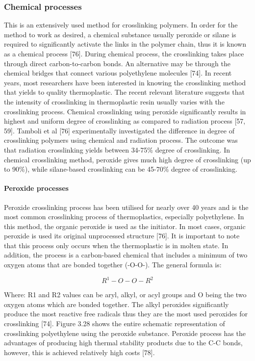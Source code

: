 \documentclass[12pt]{report}
\begin{document}

\subsubsection{Chemical processes}
This is an extensively used method for crosslinking polymers. In order for the method to work as desired, a chemical substance usually peroxide or silane is required to significantly activate the links in the polymer chain, thus it is known as a chemical process [76]. During chemical process, the crosslinking takes place through direct carbon-to-carbon bonds. An alternative may be through the chemical bridges that connect various polyethylene molecules [74].  
In recent years, most researchers have been interested in knowing the crosslinking method that yields to quality thermoplastic. The recent relevant literature suggests that the intensity of crosslinking in thermoplastic resin usually varies with the crosslinking process. Chemical crosslinking using peroxide significantly results in highest and uniform degree of crosslinking as compared to radiation process [57, 59]. Tamboli et al [76] experimentally investigated the difference in degree of crosslinking polymers using chemical and radiation process. The outcome was that radiation crosslinking yields between 34-75\% degree of crosslinking. In chemical crosslinking method, peroxide gives much high degree of crosslinking (up to 90\%), while silane-based crosslinking can be 45-70\% degree of crosslinking.

\paragraph{Peroxide processes}
 Peroxide crosslinking process has been utilised for nearly over 40 years and is the most common crosslinking process of thermoplastics, especially polyethylene. In this method, the organic peroxide is used as the initiator. In most cases, organic peroxide is used its original unprocessed structure [76]. It is important to note that this process only occurs when the thermoplastic is in molten state. In addition, the process is a carbon-based chemical that includes a minimum of two oxygen atoms that are bonded together (-O-O-). The general formula is:  

 \begin{equation}
    R^1-O-O-R^2
 \end{equation}

Where: R1 and R2 values can be aryl, alkyl, or acyl groups and O being the two oxygen atoms which are bonded together. The alkyl peroxides significantly produce the most reactive free radicals thus they are the most used peroxides for crosslinking [74]. Figure 3.28 shows the entire schematic representation of crosslinking polyethylene using the peroxide substance. Peroxide process has the advantages of producing high thermal stability products due to the C-C bonds, however, this is achieved relatively high costs [78].
\end{document}
